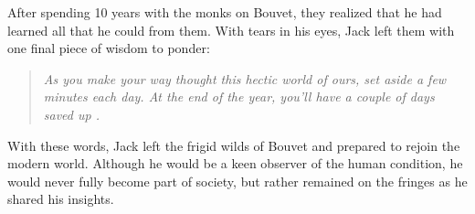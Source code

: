 After spending 10 years with the monks on Bouvet, they realized that he had learned all that he could from them.  With tears in his eyes, Jack left them with one final piece of wisdom to ponder: 
\begin{quote}
\emph{As you make your way thought this hectic world of ours, set aside a few minutes each day.  At the end of the year, you'll have a couple of days saved up \cite{Handey1994}.}
\end{quote}
With these words, Jack left the frigid wilds of Bouvet and prepared to rejoin the modern world.  Although he would be a keen observer of the human condition, he would never fully become part of society, but rather remained on the fringes as he shared his insights.
